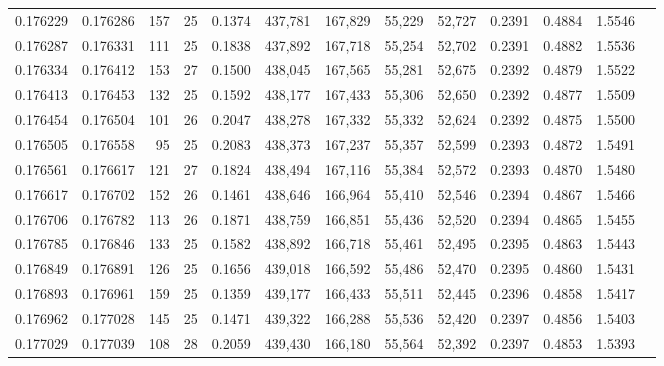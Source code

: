 \begin{tabular}{rrrrrrrrrrrrr}
0.176229 & 0.176286 & 157 &  25 &                                     0.1374 & 437,781 & 167,829 &  55,229 &  52,727 & 0.2391 & 0.4884 & 1.5546 \\
0.176287 & 0.176331 & 111 &  25 &                                     0.1838 & 437,892 & 167,718 &  55,254 &  52,702 & 0.2391 & 0.4882 & 1.5536 \\
0.176334 & 0.176412 & 153 &  27 &                                     0.1500 & 438,045 & 167,565 &  55,281 &  52,675 & 0.2392 & 0.4879 & 1.5522 \\
0.176413 & 0.176453 & 132 &  25 &                                     0.1592 & 438,177 & 167,433 &  55,306 &  52,650 & 0.2392 & 0.4877 & 1.5509 \\
0.176454 & 0.176504 & 101 &  26 &                                     0.2047 & 438,278 & 167,332 &  55,332 &  52,624 & 0.2392 & 0.4875 & 1.5500 \\
0.176505 & 0.176558 &  95 &  25 &                                     0.2083 & 438,373 & 167,237 &  55,357 &  52,599 & 0.2393 & 0.4872 & 1.5491 \\
0.176561 & 0.176617 & 121 &  27 &                                     0.1824 & 438,494 & 167,116 &  55,384 &  52,572 & 0.2393 & 0.4870 & 1.5480 \\
0.176617 & 0.176702 & 152 &  26 &                                     0.1461 & 438,646 & 166,964 &  55,410 &  52,546 & 0.2394 & 0.4867 & 1.5466 \\
0.176706 & 0.176782 & 113 &  26 &                                     0.1871 & 438,759 & 166,851 &  55,436 &  52,520 & 0.2394 & 0.4865 & 1.5455 \\
0.176785 & 0.176846 & 133 &  25 &                                     0.1582 & 438,892 & 166,718 &  55,461 &  52,495 & 0.2395 & 0.4863 & 1.5443 \\
0.176849 & 0.176891 & 126 &  25 &                                     0.1656 & 439,018 & 166,592 &  55,486 &  52,470 & 0.2395 & 0.4860 & 1.5431 \\
0.176893 & 0.176961 & 159 &  25 &                                     0.1359 & 439,177 & 166,433 &  55,511 &  52,445 & 0.2396 & 0.4858 & 1.5417 \\
0.176962 & 0.177028 & 145 &  25 &                                     0.1471 & 439,322 & 166,288 &  55,536 &  52,420 & 0.2397 & 0.4856 & 1.5403 \\
0.177029 & 0.177039 & 108 &  28 &                                     0.2059 & 439,430 & 166,180 &  55,564 &  52,392 & 0.2397 & 0.4853 & 1.5393 \\

\end{tabular}
